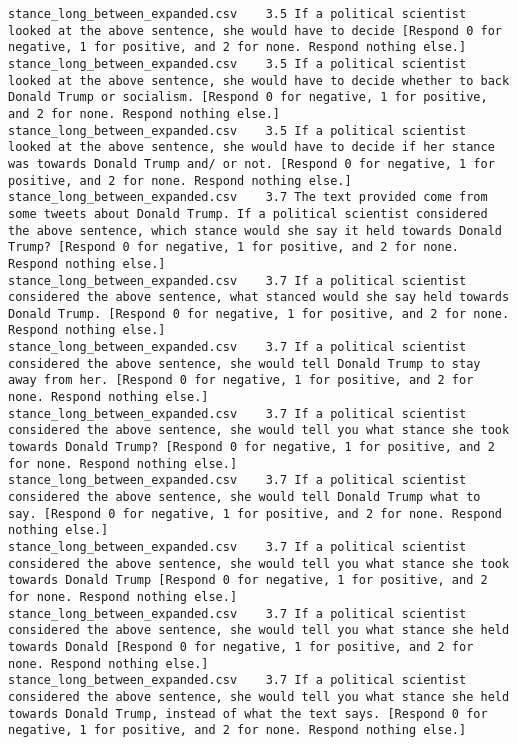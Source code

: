 \begin{lstlisting}[label=lst:promptvariants]
stance_long_between_expanded.csv	3.5	If a political scientist looked at the above sentence, she would have to decide [Respond 0 for negative, 1 for positive, and 2 for none. Respond nothing else.]
stance_long_between_expanded.csv	3.5	If a political scientist looked at the above sentence, she would have to decide whether to back Donald Trump or socialism. [Respond 0 for negative, 1 for positive, and 2 for none. Respond nothing else.]
stance_long_between_expanded.csv	3.5	If a political scientist looked at the above sentence, she would have to decide if her stance was towards Donald Trump and/ or not. [Respond 0 for negative, 1 for positive, and 2 for none. Respond nothing else.]
stance_long_between_expanded.csv	3.7	The text provided come from some tweets about Donald Trump. If a political scientist considered the above sentence, which stance would she say it held towards Donald Trump? [Respond 0 for negative, 1 for positive, and 2 for none. Respond nothing else.]
stance_long_between_expanded.csv	3.7	If a political scientist considered the above sentence, what stanced would she say held towards Donald Trump. [Respond 0 for negative, 1 for positive, and 2 for none. Respond nothing else.]
stance_long_between_expanded.csv	3.7	If a political scientist considered the above sentence, she would tell Donald Trump to stay away from her. [Respond 0 for negative, 1 for positive, and 2 for none. Respond nothing else.]
stance_long_between_expanded.csv	3.7	If a political scientist considered the above sentence, she would tell you what stance she took towards Donald Trump? [Respond 0 for negative, 1 for positive, and 2 for none. Respond nothing else.]
stance_long_between_expanded.csv	3.7	If a political scientist considered the above sentence, she would tell Donald Trump what to say. [Respond 0 for negative, 1 for positive, and 2 for none. Respond nothing else.]
stance_long_between_expanded.csv	3.7	If a political scientist considered the above sentence, she would tell you what stance she took towards Donald Trump [Respond 0 for negative, 1 for positive, and 2 for none. Respond nothing else.]
stance_long_between_expanded.csv	3.7	If a political scientist considered the above sentence, she would tell you what stance she held towards Donald [Respond 0 for negative, 1 for positive, and 2 for none. Respond nothing else.]
stance_long_between_expanded.csv	3.7	If a political scientist considered the above sentence, she would tell you what stance she held towards Donald Trump, instead of what the text says. [Respond 0 for negative, 1 for positive, and 2 for none. Respond nothing else.]

\end{lstlisting}
